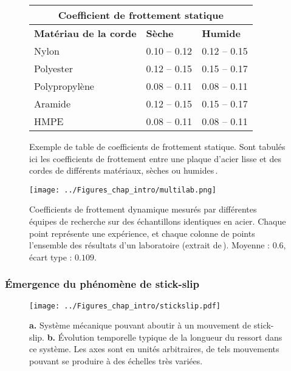 \begin{figure}[htb]
\centering
\begin{tabular}{ |p{4.5cm}||p{3cm}|p{3cm}|  }
 \hline
 \multicolumn{3}{|c|}{Coefficient de frottement statique} \\
 \hline
 \textbf{Matériau de la corde}& \textbf{Sèche} & \textbf{Humide} \\
 \hline
 Nylon         & 0.10 -- 0.12 &  0.12 -- 0.15\\
 Polyester     & 0.12 -- 0.15 &  0.15 -- 0.17\\
 Polypropylène & 0.08 -- 0.11 &  0.08 -- 0.11\\
 Aramide        & 0.12 -- 0.15 &  0.15 -- 0.17\\
 HMPE          & 0.08 -- 0.11 &  0.08 -- 0.11\\
 \hline
\end{tabular}
\caption[Exemple de table de coefficients de frottement statique]{Exemple de table de coefficients de frottement statique. Sont tabulés ici les coefficients de frottement entre une plaque d'acier lisse et des cordes de différents matériaux, sèches ou humides\,\cite{mckenna_properties_2004}.}
\label{table:coef}
\end{figure}

\begin{figure}[htb]
\centering
\texttt{[image: ../Figures\_chap\_intro/multilab.png]}
\caption[Variabilité du coefficient de frottement]{Coefficients de frottement dynamique mesurés par différentes équipes de recherche sur des échantillons identiques en acier. Chaque point représente une expérience, et chaque colonne de points l'ensemble des résultats d'un laboratoire (extrait de\,\cite{ czichos_multilaboratory_1987}). Moyenne : $0.6$, écart type : $0.109$.}
\label{fig:disparite}
\end{figure}




\subsubsection{Émergence du phénomène de stick-slip}
\label{sec:ss1}

\begin{figure}[htb]
\centering
\texttt{[image: ../Figures\_chap\_intro/stickslip.pdf]}
\caption[Mouvement de stick-slip sur un tapis roulant]{\textbf{a.} Système mécanique pouvant aboutir à un mouvement de stick-slip. \textbf{b.} Évolution temporelle typique de la longueur du ressort dans ce système. Les axes sont en unités arbitraires, de tels mouvements pouvant se produire à des échelles très variées.}
\label{fig:shemastickslip}
\end{figure}

